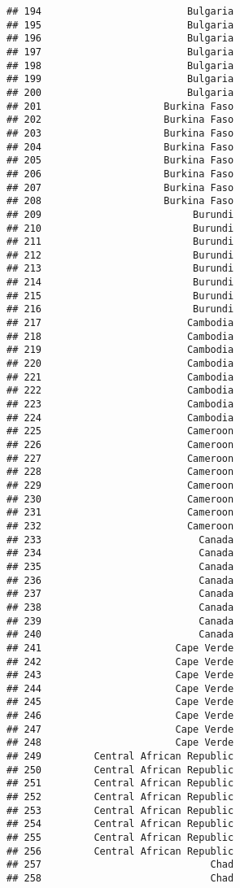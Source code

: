 \documentclass[]{article}
\begin{document}
\begin{verbatim}
## 194                         Bulgaria
## 195                         Bulgaria
## 196                         Bulgaria
## 197                         Bulgaria
## 198                         Bulgaria
## 199                         Bulgaria
## 200                         Bulgaria
## 201                     Burkina Faso
## 202                     Burkina Faso
## 203                     Burkina Faso
## 204                     Burkina Faso
## 205                     Burkina Faso
## 206                     Burkina Faso
## 207                     Burkina Faso
## 208                     Burkina Faso
## 209                          Burundi
## 210                          Burundi
## 211                          Burundi
## 212                          Burundi
## 213                          Burundi
## 214                          Burundi
## 215                          Burundi
## 216                          Burundi
## 217                         Cambodia
## 218                         Cambodia
## 219                         Cambodia
## 220                         Cambodia
## 221                         Cambodia
## 222                         Cambodia
## 223                         Cambodia
## 224                         Cambodia
## 225                         Cameroon
## 226                         Cameroon
## 227                         Cameroon
## 228                         Cameroon
## 229                         Cameroon
## 230                         Cameroon
## 231                         Cameroon
## 232                         Cameroon
## 233                           Canada
## 234                           Canada
## 235                           Canada
## 236                           Canada
## 237                           Canada
## 238                           Canada
## 239                           Canada
## 240                           Canada
## 241                       Cape Verde
## 242                       Cape Verde
## 243                       Cape Verde
## 244                       Cape Verde
## 245                       Cape Verde
## 246                       Cape Verde
## 247                       Cape Verde
## 248                       Cape Verde
## 249         Central African Republic
## 250         Central African Republic
## 251         Central African Republic
## 252         Central African Republic
## 253         Central African Republic
## 254         Central African Republic
## 255         Central African Republic
## 256         Central African Republic
## 257                             Chad
## 258                             Chad

\end{verbatim}
\end{document}

